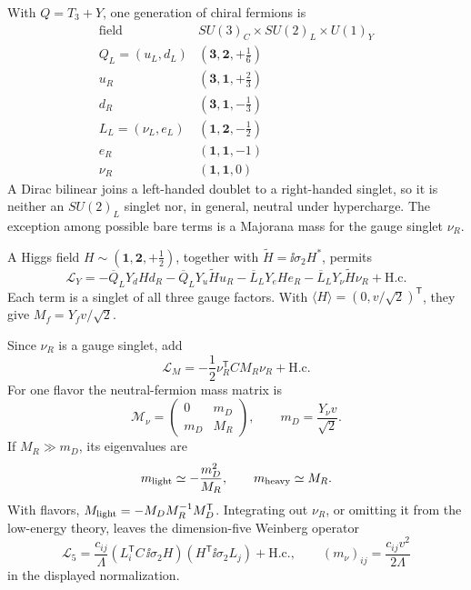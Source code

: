 \begin{enumerate}
  With \(Q=T_3+Y\), one generation of chiral fermions is
  \[
    \begin{array}{c|c}
      \text{field}&SU(3)_C\times SU(2)_L\times U(1)_Y\\ \hline
      Q_L=(u_L,d_L)&(\mathbf3,\mathbf2,+\tfrac16)\\
      u_R&(\mathbf3,\mathbf1,+\tfrac23)\\
      d_R&(\mathbf3,\mathbf1,-\tfrac13)\\
      L_L=(\nu_L,e_L)&(\mathbf1,\mathbf2,-\tfrac12)\\
      e_R&(\mathbf1,\mathbf1,-1)\\
      \nu_R&(\mathbf1,\mathbf1,0)
    \end{array}
  \]
  A Dirac bilinear joins a left-handed doublet to a right-handed singlet,
  so it is neither an \(SU(2)_L\) singlet nor, in general, neutral under
  hypercharge.  The exception among possible bare terms is a Majorana
  mass for the gauge singlet \(\nu_R\).

  A Higgs field \(H\sim(\mathbf1,\mathbf2,+\tfrac12)\), together with
  \(\widetilde H=\ii\sigma_2H^*\), permits
  \[
    \mathcal L_Y=
      -\overline Q_LY_dHd_R-\overline Q_LY_u\widetilde Hu_R
      -\overline L_LY_eHe_R-\overline L_LY_\nu\widetilde H\nu_R
      +\mathrm{H.c.}
  \]
  Each term is a singlet of all three gauge factors.  With
  \(\langle H\rangle=(0,v/\sqrt2)^{\mathsf T}\), they give
  \(M_f=Y_fv/\sqrt2\).

  Since \(\nu_R\) is a gauge singlet, add
  \[
    \mathcal L_M=-\frac12\nu_R^{\mathsf T}CM_R\nu_R+\mathrm{H.c.}
  \]
  For one flavor the neutral-fermion mass matrix is
  \[
    \mathcal M_\nu=
      \begin{pmatrix}0&m_D\\m_D&M_R\end{pmatrix},
      \qquad m_D=\frac{Y_\nu v}{\sqrt2}.
  \]
  If \(M_R\gg m_D\), its eigenvalues are
  \[
    m_{\rm light}\simeq-\frac{m_D^2}{M_R},\qquad
    m_{\rm heavy}\simeq M_R.
  \]
  With flavors,
  \(M_{\rm light}=-M_D M_R^{-1}M_D^{\mathsf T}\).
  Integrating out \(\nu_R\), or omitting it from the low-energy theory,
  leaves the dimension-five Weinberg operator
  \[
    \mathcal L_5=
      \frac{c_{ij}}{\Lambda}
      (L_i^{\mathsf T}C\,\ii\sigma_2H)
      (H^{\mathsf T}\ii\sigma_2L_j)+\mathrm{H.c.},
      \qquad
      (m_\nu)_{ij}=\frac{c_{ij}v^2}{2\Lambda}
  \]
  in the displayed normalization.


\end{enumerate}
